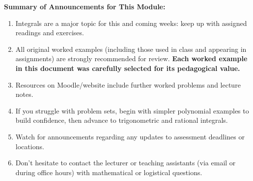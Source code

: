 \documentclass[11pt]{article}
\theoremstyle{definition}
\begin{document}
\begin{administrative_note}
\noindent\textbf{Summary of Announcements for This Module:}
\begin{enumerate}[leftmargin=*]
    \item Integrals are a major topic for this and coming weeks: keep up with assigned readings and exercises.
    \item All original worked examples (including those used in class and appearing in assignments) are strongly recommended for review. \textbf{Each worked example in this document was carefully selected for its pedagogical value.}
    \item Resources on Moodle/website include further worked problems and lecture notes.
    \item If you struggle with problem sets, begin with simpler polynomial examples to build confidence, then advance to trigonometric and rational integrals.
    \item Watch for announcements regarding any updates to assessment deadlines or locations.
    \item Don't hesitate to contact the lecturer or teaching assistants (via email or during office hours) with mathematical or logistical questions.
\end{enumerate}
\end{administrative_note}
\end{document}
